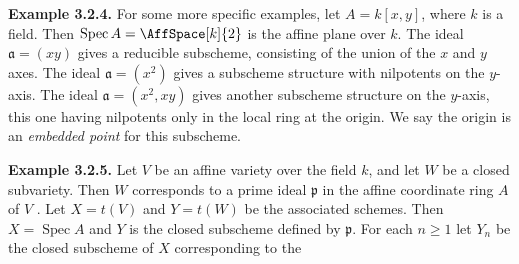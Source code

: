 {\medskip
\noindent\hypertarget{result-II-3.2.4}{}\textbf{Example 3.2.4.} For some more specific examples, let $A=k[x,y]$, where $k$ is a field. Then $\operatorname{Spec}A=\AffSpace[k]{2}$ is the affine plane over $k$. The ideal $\mathfrak a=(xy)$ gives a reducible subscheme, consisting of the union of the $x$ and $y$ axes. The ideal $\mathfrak a=(x^2)$ gives a subscheme structure with nilpotents on the $y$-axis. The ideal $\mathfrak a=(x^2,xy)$ gives another subscheme structure on the $y$-axis, this one having nilpotents only in the local ring at the origin. We say the origin is an \emph{embedded point} for this subscheme.

\medskip
\noindent\hypertarget{result-II-3.2.5}{}\textbf{Example 3.2.5.} Let $V$ be an affine variety over the field $k$, and let $W$ be a closed subvariety. Then $W$ corresponds to a prime ideal $\mathfrak p$ in the affine coordinate ring $A$ of $V$ . Let $X=t(V)$ and $Y=t(W)$ be the associated schemes. Then $X=\operatorname{Spec}A$ and $Y$ is the closed subscheme defined by $\mathfrak p$. For each $n\ge1$ let $Y_n$ be the closed subscheme of $X$ corresponding to the}
